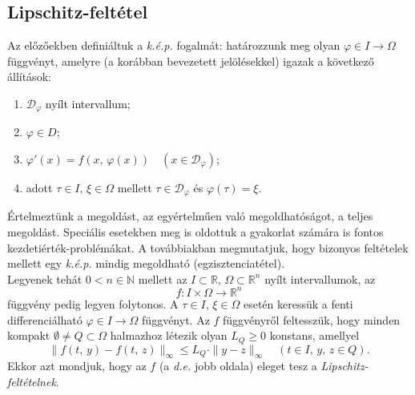 \documentclass[12pt]{article}
\newcommand{\R}{\mathbb{R}}
\newcommand{\N}{\mathbb{N}}
\newcommand{\Dp}{\mathcal{D}_\varphi}
\begin{document}
    \subsection{Lipschitz-feltétel}
    Az előzőekben definiáltuk a \textit{k.é.p.} fogalmát: határozzunk meg olyan $\varphi \in I \to \Omega$ függvényt, amelyre (a korábban bevezetett jelölésekkel) igazak a következő állítások:
    \begin{enumerate}
        \item $\mathcal{D}_\varphi$ nyílt intervallum;
        \item $\varphi \in D$;
        \item $\varphi'(x) = f(x, \, \varphi(x)) \quad (x \in \Dp)$;
        \item adott $\tau \in I, \, \xi \in \Omega$ mellett $\tau \in \Dp$ és $\varphi(\tau) = \xi$.
    \end{enumerate}
    Értelmeztünk a megoldást, az egyértelműen való megoldhatóságot, a teljes megoldást. Speciális esetekben meg is oldottuk a gyakorlat számára is fontos kezdetiérték-problémákat. A továbbiakban megmutatjuk, hogy bizonyos feltételek mellett egy \textit{k.é.p.} mindig megoldható (egzisztenciatétel).\\

    Legyenek tehát $0 < n \in \N$ mellett az $I \subset \R, \, \Omega \subset \R^n$ nyílt intervallumok, az
    \[
        f : I \times \Omega \to \R^n
    \]
    függvény pedig legyen folytonos. A $\tau \in I, \, \xi \in \Omega$ esetén keressük a fenti differenciálható $\varphi \in I \to \Omega$ függvényt. Az $f$ függvényről feltesszük, hogy minden kompakt $\emptyset \neq Q \subset \Omega$ halmazhoz létezik olyan $L_Q \geq 0$ konstans, amellyel
    \[
        \| f(t, \, y) - f(t, \, z) \|_\infty \leq L_Q \cdot \| y - z \|_\infty \quad (t \in I, \, y, \, z \in Q).
    \]
    Ekkor azt mondjuk, hogy az $f$ (a \textit{d.e.} jobb oldala) eleget tesz a \textit{Lipschitz-feltételnek}.
\end{document}
